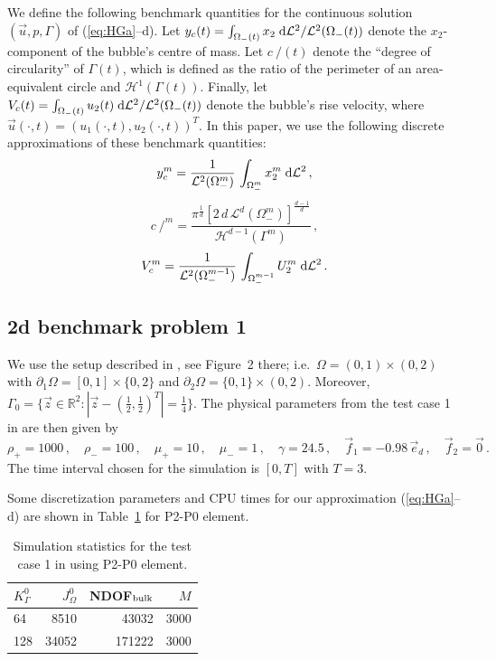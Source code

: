 \documentclass[a4paper,12pt,onecolumn]{article}
\newcommand{\R}{{\mathbb R}}
\newcommand{\dL}[1]{\;{\rm d}{\cal L}^{#1}} %
\newcommand{\strikec}{\mbox{$c\!\!\!\!\:/$}}
\newcommand{\ek}{e}
\begin{document}
We define the following benchmark quantities for the continuous solution $(\vec
u, p, \Gamma)$ of (\ref{eq:HGa}--d).
Let $y_c(t) = \int_{\Omega_-(t)} x_2 \dL2 / \mathcal{L}^2(\Omega_-(t))$ denote
the $x_2$-component of the bubble's centre of mass. Let $\strikec(t)$ denote
the ``degree of circularity'' of $\Gamma(t)$, which is defined as the ratio of
the perimeter of an area-equivalent circle and $\mathcal{H}^{1}(\Gamma(t))$.
Finally, let
$V_c(t) = \int_{\Omega_-(t)} u_2(t) \dL2 / \mathcal{L}^2(\Omega_-(t))$
denote the bubble's rise velocity, where
$\vec u(\cdot,t) = (u_1(\cdot,t),u_2(\cdot,t))^T$.
In this paper, we use the following discrete approximations of
these benchmark quantities:
\begin{equation}
y_c^m = \frac1{\mathcal{L}^2(\Omega_-^m)}\,\int_{\Omega_-^m} x_2^{m} \dL2\,,
\end{equation}
\begin{equation}
\strikec^m =
\frac{\pi^{\frac{1}{d}}[2\,d\,\mathcal{L}^d(\Omega_-^m)]^\frac{d-1}{d}}
{\mathcal{H}^{d-1}(\Gamma^m)}\,,
\end{equation}
\begin{equation}
V^m_c = \frac1{\mathcal{L}^2(\Omega_-^{m-1})}\,\int_{\Omega_-^{m-1}}U^m_2\dL2\,.
\end{equation}

\subsection{2d benchmark problem 1} \label{sec:2d_benchmark_1}
We use the setup described in \cite{HysingTKPBGT09}, see Figure~2 there;
i.e.\ $\Omega = (0,1) \times (0,2)$ with
$\partial_1\Omega = [0,1] \times \{0,2\}$ and
$\partial_2\Omega = \{0,1\} \times (0,2)$.
Moreover, $\Gamma_0 = \{\vec z \in \R^2 : |\vec z - (\frac12, \frac{1}{2})^T| =
\frac{1}{4}\}$.
The physical parameters from the test case 1 in \cite[Table~I]{HysingTKPBGT09}
are then given by
\begin{equation} \label{eq:Hysing1}
\rho_+ = 1000\,,\quad \rho_- = 100\,,\quad \mu_+ = 10\,,\quad \mu_- = 1\,,\quad
\gamma = 24.5\,,\quad \vec f_1 = -0.98\,\vec\ek_d\,,\quad \vec f_2 = \vec 0\,.
\end{equation}
The time interval chosen for the simulation is $[0,T]$ with $T=3$.

Some discretization parameters and CPU times for our approximation
(\ref{eq:HGa}--d) are shown in Table~\ref{tab:2d_CPU_P0} for P2-P0 element.

\begin{table}
\center
\begin{tabular}{lrrr}
\hline
$K^0_\Gamma$ & $J^0_\Omega$ & NDOF$_{\rm bulk}$ & $M$ \\
\hline
64 & 8510 & 43032 & 3000 \\
128 & 34052 & 171222 & 3000 \\
\hline
\end{tabular}
\caption{Simulation statistics for the test case 1 in \cite{HysingTKPBGT09}
using P2-P0 element.}
\label{tab:2d_CPU_P0}
\end{table}
\end{document}
